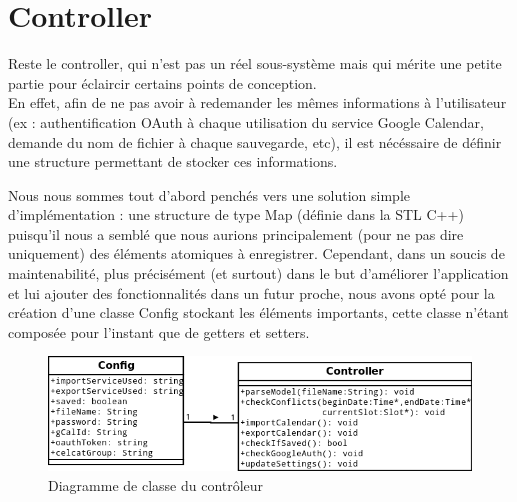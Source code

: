 \chapter{Controller}
	Reste le controller, qui n'est pas un réel sous-système mais qui mérite une petite partie pour éclaircir certains points de conception.\\
	
	En effet, afin de ne pas avoir à redemander les mêmes informations à l'utilisateur (ex : authentification OAuth à chaque utilisation du service Google Calendar, demande du nom de fichier à chaque sauvegarde, etc), il est nécéssaire de définir une structure permettant de stocker ces informations.
	
	Nous nous sommes tout d'abord penchés vers une solution simple d'implémentation : une structure de type Map (définie dans la STL C++) puisqu'il nous a semblé que nous aurions principalement (pour ne pas dire uniquement) des éléments atomiques à enregistrer. Cependant, dans un soucis de maintenabilité, plus précisément (et surtout) dans le but d'améliorer l'application et lui ajouter des fonctionnalités dans un futur proche, nous avons opté pour la création d'une classe Config stockant les éléments importants, cette classe n'étant composée pour l'instant que de getters et setters.
	\begin{figure}[!h]
		\centering
		\includegraphics[scale=0.65]{diagclasses_controller.png}
		\caption{Diagramme de classe du contrôleur}
	\end{figure}
	\FloatBarrier
